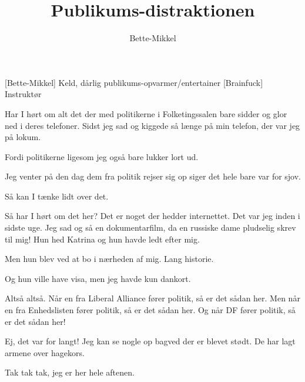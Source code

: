 \documentclass[a4paper,11pt]{article}
\title{Publikums-distraktionen}
\author{Bette-Mikkel}
\begin{document}
\maketitle

\begin{roles}
[Bette-Mikkel] Keld, dårlig publikums-opvarmer/entertainer
[Brainfuck] Instruktør
\end{roles}


\begin{sketch}

 Har I hørt om alt det der med politikerne i Folketingssalen bare sidder og glor ned i deres telefoner.  Sidst jeg sad og kiggede så længe på min telefon, der var jeg på lokum.


 Fordi politikerne ligesom jeg også bare lukker lort ud.


 Jeg venter på den dag dem fra politik rejser sig op siger det hele bare var for sjov.



 Så kan I tænke lidt over det.

 Så har I hørt om det her?  Det er noget der hedder internettet.  Det var jeg inden i sidste uge.  Jeg sad og så en dokumentarfilm, da en russiske dame pludselig skrev til mig!  Hun hed Katrina og hun havde ledt efter mig.

Men hun blev ved at bo i nærheden af mig.  Lang historie.

Og hun ville have visa, men jeg havde kun dankort.


 Altså altså.  Når en fra Liberal Alliance fører politik, så er det sådan her.   Men når en fra Enhedslisten fører politik, så er det sådan her.   Og når DF fører politik, så er det sådan her! 


 Ej, det var for langt!  Jeg kan se nogle op bagved der er blevet stødt.  De har lagt armene over hagekors.


 Tak tak tak, jeg er her hele aftenen.

\end{sketch}
\end{document}
